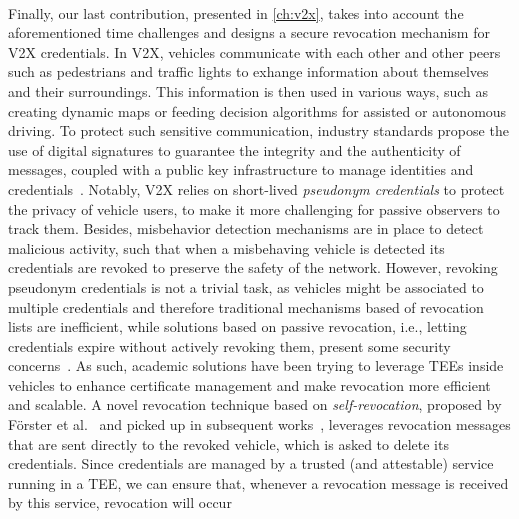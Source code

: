 \begin{formal}
    \papertimerefr{}
\end{formal}

\paragraph{\papervtoxtitle}

Finally, our last contribution, presented in \cref{ch:v2x}, takes into account
the aforementioned time challenges and designs a secure revocation mechanism for
\ac{V2X} credentials. In \ac{V2X}, vehicles communicate with each other and
other peers such as pedestrians and traffic lights to exhange information about
themselves and their surroundings. This information is then used in various
ways, such as creating dynamic maps or feeding decision algorithms for assisted
or autonomous driving. To protect such sensitive communication, industry
standards propose the use of digital signatures to guarantee the integrity and
the authenticity of messages, coupled with a public key infrastructure to manage
identities and credentials~\cite{etsi2022102941,brecht2018scms}. Notably,
\ac{V2X} relies on short-lived \emph{pseudonym credentials} to protect the
privacy of vehicle users, to make it more challenging for passive observers to
track them. Besides, misbehavior detection mechanisms are in place to detect
malicious activity, such that when a misbehaving vehicle is detected its
credentials are revoked to preserve the safety of the network. However, revoking
pseudonym credentials is not a trivial task, as vehicles might be associated to
multiple credentials and therefore traditional mechanisms based of revocation
lists are inefficient, while solutions based on passive revocation, i.e.,
letting credentials expire without actively revoking them, present some security
concerns~\cite{yoshizawa2022v2x_survey}. As such, academic solutions have been
trying to leverage \acp{TEE} inside vehicles to enhance certificate management
and make revocation more efficient and scalable. A novel revocation technique
based on \emph{self-revocation}, proposed by F\"orster et
al.~\cite{forster2015rewire} and picked up in subsequent
works~\cite{whitefield2017privacy,desmoulins2019practical,larsen2021daa},
leverages revocation messages that are sent directly to the revoked vehicle,
which is asked to delete its credentials. Since credentials are managed by a
trusted (and attestable) service running in a \ac{TEE}, we can ensure that,
whenever a revocation message is received by this service, revocation will occur
